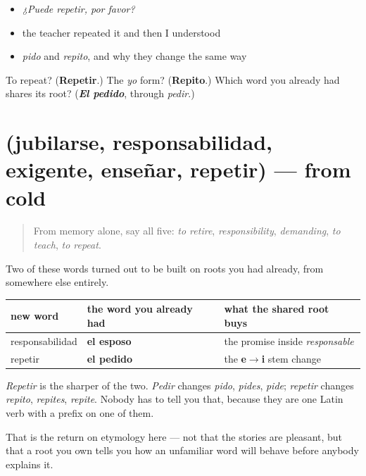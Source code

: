 \begin{itemize}
\raggedright
  \item \emph{¿Puede repetir, por favor?}
  \item the teacher repeated it and then I understood
  \item \emph{pido} and \emph{repito}, and why they change the same way
\end{itemize}

\begin{tcolorbox}[breakable,colback=teal!4,colframe=teal!35!black,title={Before you move on}]
To repeat? (\textbf{Repetir}.) The \emph{yo} form? (\textbf{Repito}.) Which word you already had shares its root? (\emph{\textbf{El pedido}}, through \emph{pedir}.)
\end{tcolorbox}
\section[(jubilarse, responsabilidad, exigente …]{(jubilarse, responsabilidad, exigente, enseñar, repetir) — from cold}

\label{lesson:ES-R445-repaso-puesto}



\begin{quote}
From memory alone, say all five: \emph{to retire}, \emph{responsibility}, \emph{demanding}, \emph{to teach}, \emph{to repeat}.
\end{quote}

\begin{grammarlens}[title={Grammar Lens: a root you own predicts how a new word behaves}]
Two of these words turned out to be built on roots you had already, from somewhere else entirely.

\noindent
\begin{tabularx}{\linewidth}{@{}>{\raggedright\arraybackslash}X>{\raggedright\arraybackslash}X>{\raggedright\arraybackslash}X@{}}
\toprule
\textbf{new word} & \textbf{the word you already had} & \textbf{what the shared root buys} \\
\midrule
responsabilidad & \textbf{el esposo} & the promise inside \emph{responsable} \\
repetir & \textbf{el pedido} & the \textbf{e$\to$i} stem change \\
\bottomrule
\end{tabularx}

\emph{Repetir} is the sharper of the two. \emph{Pedir} changes \emph{pido}, \emph{pides}, \emph{pide}; \emph{repetir} changes \emph{repito}, \emph{repites}, \emph{repite}. Nobody has to tell you that, because they are one Latin verb with a prefix on one of them.

That is the return on etymology here — not that the stories are pleasant, but that a root you own tells you how an unfamiliar word will behave before anybody explains it.
\end{grammarlens}

